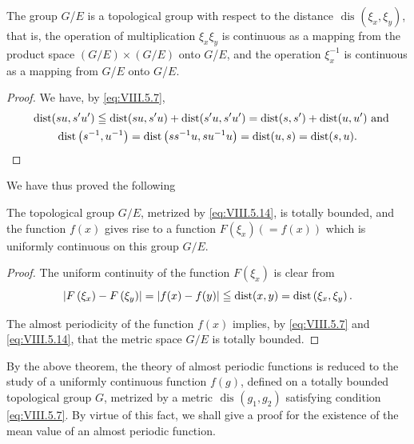 \begin{corollary}\label{cor:VIII.5.Corollary.5} The group $G$/$E$ is a topological group with respect to the distance $\text{ dis }(\xi_{x}, \xi_{y})$, that is, the operation of multiplication $\xi_{x}\xi_{y}$ is continuous as a mapping from the product space $(G/E)\times(G/E)$ onto $G$/$E$, and the operation $\xi_{x}^{-1}$ is continuous as a mapping from $G$/$E$ onto $G$/$E$. 
\end{corollary}

\begin{proof}
 We have, by \eqref{eq:VIII.5.7}, 
\begin{gather}\quad \operatorname{dist} (s u, s ^{\prime} u ^{\prime})\leqq \operatorname{dist} (s u, s ^{\prime} u) + \operatorname{dist} (s ^{\prime} u, s ^{\prime} u ^{\prime}) = \operatorname{dist} (s, s ^{\prime}) + \operatorname{dist} (u, u ^{\prime}) \text{ and } \notag
\\\operatorname{dist} \left(s ^{-1}, u ^{-1}\right) = \operatorname{dist} \left(s s ^{-1} u, s u ^{-1} u\right) = \operatorname{dist} (u, s) = \operatorname{dist} (s, u). \notag
\end{gather}
\end{proof}

We have thus proved the following 

\begin{theorem}\label{thm:VIII.5.Theorem.1} The topological group $G / E$, metrized by \eqref{eq:VIII.5.14}, is totally bounded, and the function $f(x)$ gives rise to a function $F(\xi_x) (= f(x))$ which is uniformly continuous on this group $G / E$. 
\end{theorem}

\begin{proof}
 The uniform continuity of the function $F(\xi_x)$ is clear from 
\[
\left| F \left(\xi_{x}\right) - F \left(\xi_{y}\right) \right| = \left| f (x) - f (y) \right| \leqq \operatorname{dist} (x, y) = \operatorname{dist} \left(\xi_{x}, \xi_{y}\right). \]

The almost periodicity of the function $f(x)$ implies, by \eqref{eq:VIII.5.7} and \eqref{eq:VIII.5.14}, that the metric space $G / E$ is totally bounded. 
\end{proof}

By the above theorem, the theory of almost periodic functions is reduced to the study of a uniformly continuous function $f(g)$, defined on a totally bounded topological group $G$, metrized by a metric $\text{ dis }(g_{1}, g_{2})$ satisfying condition \eqref{eq:VIII.5.7}. By virtue of this fact, we shall give a proof for the existence of the mean value of an almost periodic function. 

